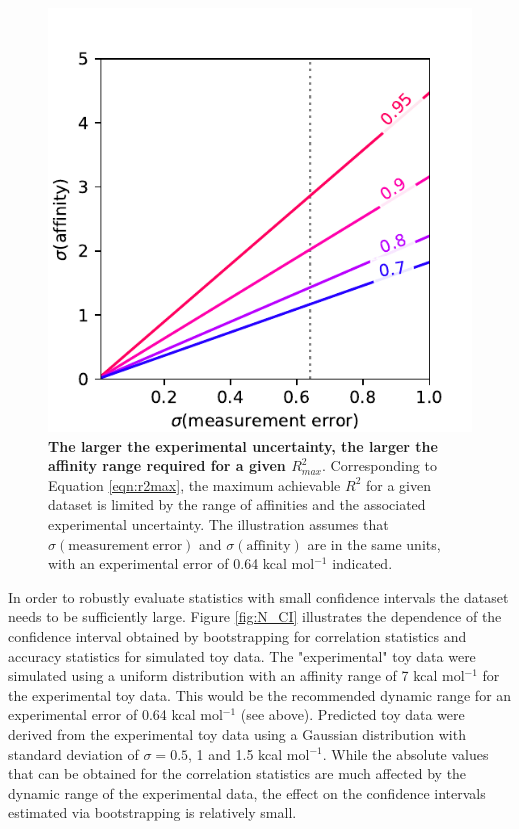 \documentclass[9pt,bestpractices]{livecoms}
\begin{document}
\begin{figure}
    \includegraphics[width=0.95\linewidth]{figures/R2max.pdf}
    \caption{\textbf{The larger the experimental uncertainty, the larger the affinity range required for a given $R^2_{max}$}. Corresponding to Equation \ref{eqn:r2max}, the maximum achievable $R^2$ for a given dataset is limited by the range of affinities and the associated experimental uncertainty. The illustration assumes that $\sigma(\mathrm{measurement\ error})$ and $\sigma(\mathrm{affinity})$ are in the same units, with an experimental error of 0.64 kcal mol$^{-1}$ indicated.}
    \label{fig:r2max}
\end{figure}

In order to robustly evaluate statistics with small confidence intervals the dataset needs to be sufficiently large. Figure \ref{fig:N_CI} illustrates the dependence of the confidence interval obtained by bootstrapping for correlation statistics and accuracy statistics for simulated toy data. The "experimental" toy data were simulated using a uniform distribution with an affinity range of 7 kcal mol$^{-1}$ for the experimental toy data. This would be the recommended dynamic range for an experimental error of 0.64 kcal mol$^{-1}$ (see above). Predicted toy data were derived from the experimental toy data using a Gaussian distribution with standard deviation of $\sigma = 0.5$, 1 and 1.5 kcal mol$^{-1}$. While the absolute values that can be obtained for the correlation statistics are much affected by the dynamic range of the experimental data, the effect on the confidence intervals estimated via bootstrapping is relatively small.
\end{document}
